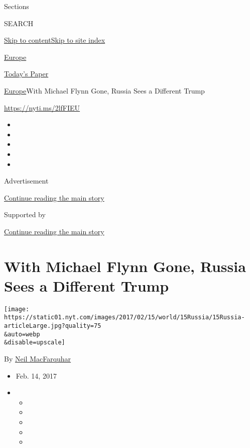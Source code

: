 Sections

SEARCH

\protect\hyperlink{site-content}{Skip to
content}\protect\hyperlink{site-index}{Skip to site index}

\href{https://www.nytimes.com/section/world/europe}{Europe}

\href{https://myaccount.nytimes.com/auth/login?response_type=cookie\&client_id=vi}{}

\href{https://www.nytimes.com/section/todayspaper}{Today's Paper}

\href{/section/world/europe}{Europe}\textbar{}With Michael Flynn Gone,
Russia Sees a Different Trump

\url{https://nyti.ms/2lfFIEU}

\begin{itemize}
\item
\item
\item
\item
\item
\end{itemize}

Advertisement

\protect\hyperlink{after-top}{Continue reading the main story}

Supported by

\protect\hyperlink{after-sponsor}{Continue reading the main story}

\hypertarget{with-michael-flynn-gone-russia-sees-a-different-trump}{%
\section{With Michael Flynn Gone, Russia Sees a Different
Trump}\label{with-michael-flynn-gone-russia-sees-a-different-trump}}

\texttt{[image: https://static01.nyt.com/images/2017/02/15/world/15Russia/15Russia-articleLarge.jpg?quality=75\\\&auto=webp\\\&disable=upscale]}

By \href{http://www.nytimes.com/by/neil-macfarquhar}{Neil MacFarquhar}

\begin{itemize}
\item
  Feb. 14, 2017
\item
  \begin{itemize}
  \item
  \item
  \item
  \item
  \item
  \end{itemize}
\end{itemize}

